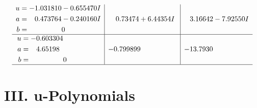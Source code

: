 \documentclass[1p]{elsarticle_modified}
\theoremstyle{definition}
\begin{document}
$$\begin{array}{c|c|c}
\begin{aligned}
u &= -1.031810 - 0.655470 I \\
a &= \phantom{-}0.473764 - 0.240160 I \\
b &= \phantom{-0.000000 } 0\end{aligned}
 & \phantom{-}0.73474 + 6.44354 I & \phantom{-}3.16642 - 7.92550 I \\ \hline\begin{aligned}
u &= -0.603304\phantom{ +0.000000I} \\
a &= \phantom{-}4.65198\phantom{ +0.000000I} \\
b &= \phantom{-0.000000 } 0\end{aligned}
 & -0.799899\phantom{ +0.000000I} & -13.7930\phantom{ +0.000000I}\\
 \hline 
 \end{array}$$\newpage
\newpage\renewcommand{\arraystretch}{1}
\centering \section*{ III. u-Polynomials}
\end{document}
